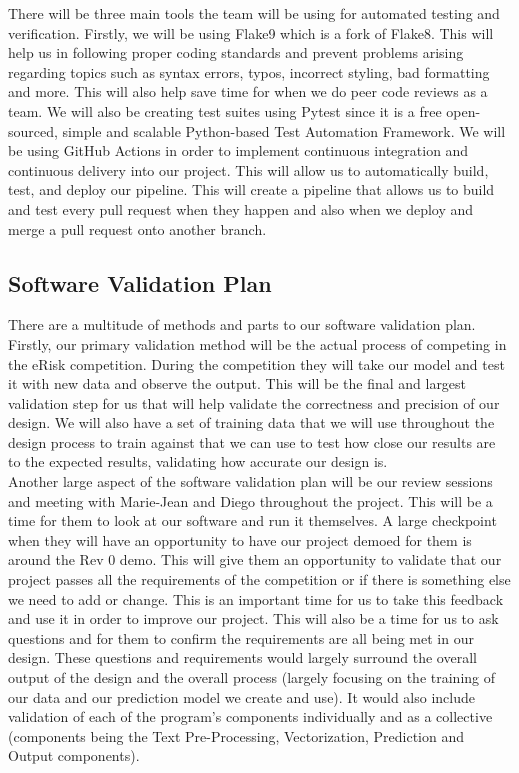 \documentclass[12pt, titlepage]{article}
\begin{document}
  There will be three main tools the team will be using for automated testing and verification. Firstly, we will be using Flake9 which is a fork of Flake8. This will help us in following proper coding standards and prevent problems arising regarding topics such as syntax errors, typos, incorrect styling, bad formatting and more. This will also help save time for when we do peer code reviews as a team. We will also be creating test suites using Pytest since it is a free open-sourced, simple and scalable Python-based Test Automation Framework. We will be using GitHub Actions in order to implement continuous integration and continuous delivery into our project. This will allow us to automatically build, test, and deploy our pipeline. This will create a pipeline that allows us to build and test every pull request when they happen and also when we deploy and merge a pull request onto another branch.
  
  \subsection{Software Validation Plan} \label{Software Validation Plan}
  
  There are a multitude of methods and parts to our software validation plan. Firstly, our primary validation method will be the actual process of competing in the eRisk competition. During the competition they will take our model and test it with new data and observe the output. This will be the final and largest validation step for us that will help validate the correctness and precision of our design. We will also have a set of training data that we will use throughout the design process to train against that we can use to test how close our results are to the expected results, validating how accurate our design is. \\

  Another large aspect of the software validation plan will be our review sessions and meeting with Marie-Jean and Diego throughout the project. This will be a time for them to look at our software and run it themselves. A large checkpoint when they will have an opportunity to have our project demoed for them is around the Rev 0 demo. This will give them an opportunity to validate that our project passes all the requirements of the competition or if there is something else we need to add or change. This is an important time for us to take this feedback and use it in order to improve our project. This will also be a time for us to ask questions and for them to confirm the requirements are all being met in our design. These questions and requirements would largely surround the overall output of the design and the overall process (largely focusing on the training of our data and our prediction model we create and use). It would also include validation of each of the program's components individually and as a collective (components being the Text Pre-Processing, Vectorization, Prediction and Output components). \\
\end{document}

